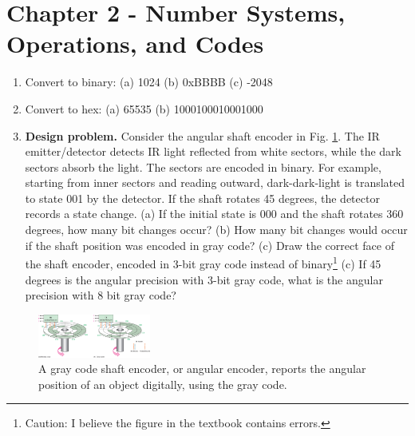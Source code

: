 \documentclass[10pt]{article}
\begin{document}
\section{Chapter 2 - Number Systems, Operations, and Codes}

\begin{enumerate}
\item Convert to binary: (a) 1024 (b) 0xBBBB (c) -2048 \\ \vspace{1cm}
\item Convert to hex: (a) 65535 (b) 1000100010001000 \\ \vspace{1cm}
\item \textbf{Design problem.}  Consider the angular shaft encoder in Fig. \ref{fig:grayCode}.  The IR emitter/detector detects IR light reflected from white sectors, while the dark sectors absorb the light.  The sectors are encoded in binary.  For example, starting from inner sectors and reading outward, dark-dark-light is translated to state 001 by the detector.  If the shaft rotates 45 degrees, the detector records a state change.  (a) If the initial state is 000 and the shaft rotates 360 degrees, how many bit changes occur?  (b) How many bit changes would occur if the shaft position was encoded in gray code?  (c) Draw the correct face of the shaft encoder, encoded in 3-bit gray code instead of binary\footnote{Caution: I believe the figure in the textbook contains errors.} (c) If 45 degrees is the angular precision with 3-bit gray code, what is the angular precision with 8 bit gray code? \\ \vspace{2cm}
\end{enumerate}
\begin{figure}[hb]
\centering
\includegraphics[width=0.33\textwidth,trim=0cm 0cm 12cm 0cm,clip=true]{gray_code_shaft.jpg}
\caption{\label{fig:grayCode} A gray code shaft encoder, or angular encoder, reports the angular position of an object digitally, using the gray code.}
\end{figure}
\end{document}
